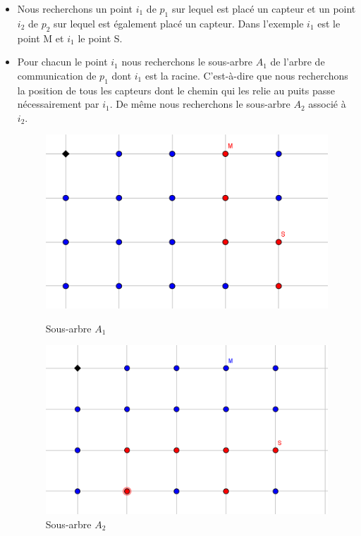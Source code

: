 \documentclass[12pt,a4paper]{article}
\begin{document}
\begin{itemize}
\item Nous recherchons un point $i_1$ de $p_1$ sur lequel est placé un capteur et un point $i_2$ de $p_2$ sur lequel est également placé un capteur. Dans l'exemple $i_1$ est le point M et $i_1$ le point S.
\item Pour chacun le point $i_1$ nous recherchons le sous-arbre $A_1$ de l'arbre de communication de $p_1$ dont $i_1$ est la racine. C'est-à-dire que nous recherchons la position de tous les capteurs dont le chemin qui les relie au puits passe nécessairement par $i_1$. De même nous recherchons le sous-arbre $A_2$ associé à $i_2$. 
\begin{figure}[h]
\center
\includegraphics[scale=1]{Images/A_1.png}
\caption{Sous-arbre $A_1$}
\includegraphics[scale=1]{Images/A_2.png}
\caption{Sous-arbre $A_2$}
\end{figure}


\end{itemize}
\end{document}
